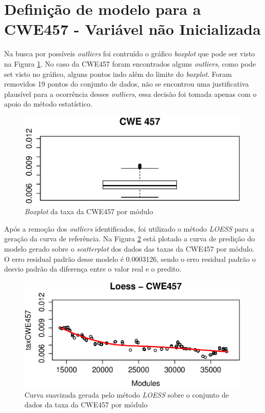 \section{Definição de modelo para a CWE457 - Variável não Inicializada}

Na busca por possíveis \textit{outliers} foi contruído o gráfico
\textit{boxplot} que pode ser visto na Figura \ref{fig:cwe457-boxplot}. No caso
da CWE457 foram encontrados alguns \textit{outliers}, como pode set visto no
gráfico, alguns pontos indo além do limite do \textit{boxplot}. Foram removidos
19 pontos do conjunto de dados, não se encontrou uma justificativa plausível
para a ocorrência desses \textit{outliers}, essa decisão foi tomada apenas com o
apoio do método estatístico.

\begin{figure}[h]
  \centering
  \includegraphics[width=1.0\textwidth]
      {figuras/cwe457-boxplot.eps}
      \caption{\textit{Boxplot} da taxa da CWE457 por módulo}
  \label{fig:cwe457-boxplot}
\end{figure}

Após a remoção dos \textit{outliers} identificados, foi utilizado o método
\textit{LOESS} para a geração da curva de referência. Na Figura
\ref{fig:cwe457-loess} está plotado a curva de predição do modelo gerado sobre o
\textit{scatterplot} dos dados das taxas da CWE457 por módulo. O erro residual
padrão desse modelo é 0.0003126, sendo o erro residual padrão o desvio padrão da
diferença entre o valor real e o predito.

\begin{figure}[h]
  \centering
  \includegraphics[width=1.0\textwidth]
      {figuras/cwe457-loess.eps}
      \caption{Curva suavizada gerada pelo método \textit{LOESS} sobre o
      conjunto de dados da taxa da CWE457 por módulo}
  \label{fig:cwe457-loess}
\end{figure}

